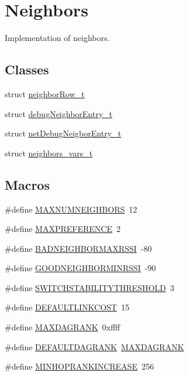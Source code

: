 \hypertarget{group___neighbors}{}\section{Neighbors}
\label{group___neighbors}


Implementation of neighbors.  


\subsection*{Classes}
\begin{DoxyCompactItemize}
\item 
struct \hyperlink{structneighbor_row__t}{neighbor\+Row\+\_\+t}
\item 
struct \hyperlink{structdebug_neighbor_entry__t}{debug\+Neighbor\+Entry\+\_\+t}
\item 
struct \hyperlink{structnet_debug_neigbor_entry__t}{net\+Debug\+Neigbor\+Entry\+\_\+t}
\item 
struct \hyperlink{structneighbors__vars__t}{neighbors\+\_\+vars\+\_\+t}
\end{DoxyCompactItemize}
\subsection*{Macros}
\begin{DoxyCompactItemize}
\item 
\#define \hyperlink{group___neighbors_gaf83606573bb704d34705b540c226a0d9}{M\+A\+X\+N\+U\+M\+N\+E\+I\+G\+H\+B\+O\+RS}~12
\item 
\#define \hyperlink{group___neighbors_ga6a269e3fd9f5dc2fe01c351944352799}{M\+A\+X\+P\+R\+E\+F\+E\+R\+E\+N\+CE}~2
\item 
\#define \hyperlink{group___neighbors_ga2c403faa9006b83e020166536b480025}{B\+A\+D\+N\+E\+I\+G\+H\+B\+O\+R\+M\+A\+X\+R\+S\+SI}~-\/80
\item 
\#define \hyperlink{group___neighbors_ga6e36748acedcb5b5ca037ad19227aeec}{G\+O\+O\+D\+N\+E\+I\+G\+H\+B\+O\+R\+M\+I\+N\+R\+S\+SI}~-\/90
\item 
\#define \hyperlink{group___neighbors_ga756051d437b8e4198fe0432b5d73a48b}{S\+W\+I\+T\+C\+H\+S\+T\+A\+B\+I\+L\+I\+T\+Y\+T\+H\+R\+E\+S\+H\+O\+LD}~3
\item 
\#define \hyperlink{group___neighbors_ga4d2874b0e44346069a08e6cf15d85d87}{D\+E\+F\+A\+U\+L\+T\+L\+I\+N\+K\+C\+O\+ST}~15
\item 
\#define \hyperlink{group___neighbors_gaec4751ff896721a5a0fd70b841d09724}{M\+A\+X\+D\+A\+G\+R\+A\+NK}~0xffff
\item 
\#define \hyperlink{group___neighbors_gacc9a3232f2dca59348d8b536005a2f89}{D\+E\+F\+A\+U\+L\+T\+D\+A\+G\+R\+A\+NK}~\hyperlink{group___neighbors_gaec4751ff896721a5a0fd70b841d09724}{M\+A\+X\+D\+A\+G\+R\+A\+NK}
\item 
\#define \hyperlink{group___neighbors_gaa81003e9317e9cd007be68d37a09eb40}{M\+I\+N\+H\+O\+P\+R\+A\+N\+K\+I\+N\+C\+R\+E\+A\+SE}~256
\end{DoxyCompactItemize}
